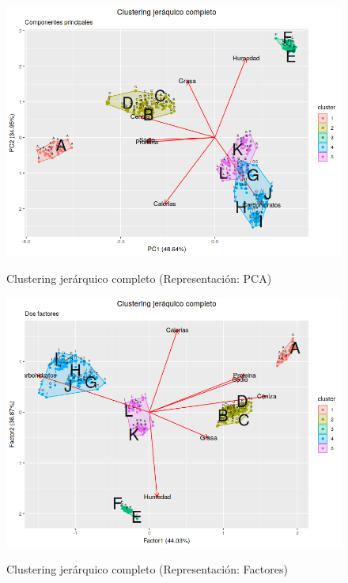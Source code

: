 \begin{figure}[h]
\centering
	\includegraphics[scale=.75]{images/clusterPCA.png} 
	\label{i_cluster_PCA}
	\caption{Clustering jerárquico completo (Representación: PCA)}
\end{figure}


\begin{figure}[h]
\centering
	\includegraphics[scale=.75]{images/clusterFactores.png} 
	\label{i_cluster_Factores}
	\caption{Clustering jerárquico completo (Representación: Factores)}
\end{figure}